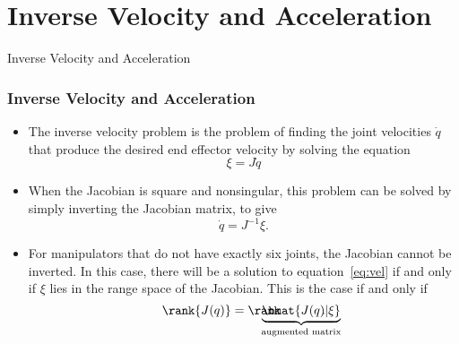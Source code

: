 \section{Inverse Velocity and Acceleration}

\begin{frame}
    Inverse Velocity and Acceleration


\end{frame}

\begingroup
\small


\begin{frame}
    \frametitle{Inverse Velocity and Acceleration}

    \begin{itemize}
        \item The inverse velocity problem is the problem of finding the joint
        velocities $\dot{q}$ that produce the desired end effector velocity by
        solving the equation
        \begin{equation}
            \xi = J\dot{q}
            \label{eq:vel}
        \end{equation}
        \item When the Jacobian is square and nonsingular, this problem can be 
        solved by simply inverting the Jacobian matrix, to give \[\dot{q} = J^{-1}\xi. \]
        \item For manipulators that do not have exactly six joints, the Jacobian
        cannot be inverted. In this case, there will be a solution to
        equation~\eqref{eq:vel} if and only if $\xi$ lies in the range space of
        the Jacobian. This is the case if and only if \[ \rank{J(q)} = \rank
        \hspace{-6mm} \underbrace{\bmat{J(q) | \xi}}_{\textrm{augmented matrix}}
        \hspace{-6mm}. \]
    \end{itemize}
\end{frame}


